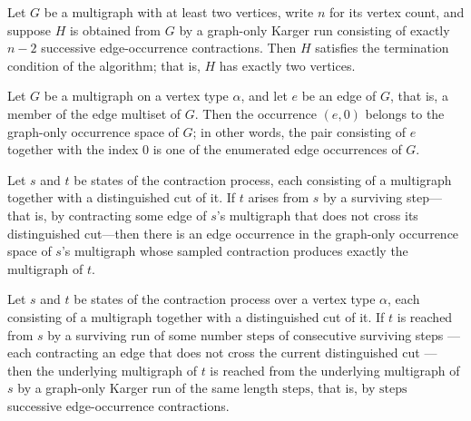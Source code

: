 \begin{lemma}
\label{KargerTrace.kargerGraphRun_full_output}
\leanok
{}
Let $G$ be a multigraph with at least two vertices, write $n$ for its vertex count, and
suppose $H$ is obtained from $G$ by a graph-only Karger run consisting of exactly $n -
2$ successive edge-occurrence contractions. Then $H$ satisfies the termination condition
of the algorithm; that is, $H$ has exactly two vertices.
\end{lemma}

\begin{lemma}
\label{KargerTrace.choice_mem_graphChoiceSpace_of_edge_mem}
\leanok
{}
Let $G$ be a multigraph on a vertex type $\alpha$, and let $e$ be an edge of $G$, that
is, a member of the edge multiset of $G$. Then the occurrence $(e, 0)$ belongs to the
graph-only occurrence space of $G$; in other words, the pair consisting of $e$ together
with the index $0$ is one of the enumerated edge occurrences of $G$.
\end{lemma}

\begin{lemma}
\label{KargerTrace.survivingStep_graphChoice}
\leanok
{}
Let $s$ and $t$ be states of the contraction process, each consisting of a multigraph
together with a distinguished cut of it. If $t$ arises from $s$ by a surviving step—that
is, by contracting some edge of $s$'s multigraph that does not cross its distinguished
cut—then there is an edge occurrence in the graph-only occurrence space of $s$'s
multigraph whose sampled contraction produces exactly the multigraph of $t$.
\end{lemma}

\begin{lemma}
\label{KargerTrace.survivingRun_graphRun}
\leanok
{}
Let $s$ and $t$ be states of the contraction process over a vertex type $\alpha$, each
consisting of a multigraph together with a distinguished cut of it. If $t$ is reached
from $s$ by a surviving run of some number $\mathrm{steps}$ of consecutive surviving
steps — each contracting an edge that does not cross the current distinguished cut —
then the underlying multigraph of $t$ is reached from the underlying multigraph of $s$
by a graph-only Karger run of the same length $\mathrm{steps}$, that is, by
$\mathrm{steps}$ successive edge-occurrence contractions.
\end{lemma}

